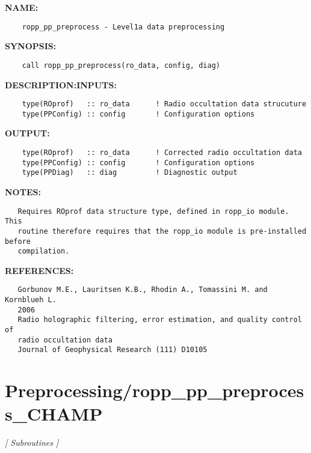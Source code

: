 \label{ch:robo79}
\label{ch:Preprocessing_ropp_pp_preprocess}
\textbf{NAME:}\hspace{0.08in}\begin{Verbatim}
    ropp_pp_preprocess - Level1a data preprocessing
\end{Verbatim}
\textbf{SYNOPSIS:}\hspace{0.08in}\begin{Verbatim}
    call ropp_pp_preprocess(ro_data, config, diag)
\end{Verbatim}
\textbf{DESCRIPTION:}\hspace{0.08in}\textbf{INPUTS:}\hspace{0.08in}\begin{Verbatim}
    type(ROprof)   :: ro_data      ! Radio occultation data strucuture
    type(PPConfig) :: config       ! Configuration options
\end{Verbatim}
\textbf{OUTPUT:}\hspace{0.08in}\begin{Verbatim}
    type(ROprof)   :: ro_data      ! Corrected radio occultation data
    type(PPConfig) :: config       ! Configuration options
    type(PPDiag)   :: diag         ! Diagnostic output
\end{Verbatim}
\textbf{NOTES:}\hspace{0.08in}\begin{Verbatim}
   Requires ROprof data structure type, defined in ropp_io module. This
   routine therefore requires that the ropp_io module is pre-installed before
   compilation.
\end{Verbatim}
\textbf{REFERENCES:}\hspace{0.08in}\begin{Verbatim}
   Gorbunov M.E., Lauritsen K.B., Rhodin A., Tomassini M. and Kornblueh L.
   2006
   Radio holographic filtering, error estimation, and quality control of
   radio occultation data
   Journal of Geophysical Research (111) D10105
\end{Verbatim}
\section{Preprocessing/ropp\_pp\_preprocess\_CHAMP}
\textsl{[ Subroutines ]}

